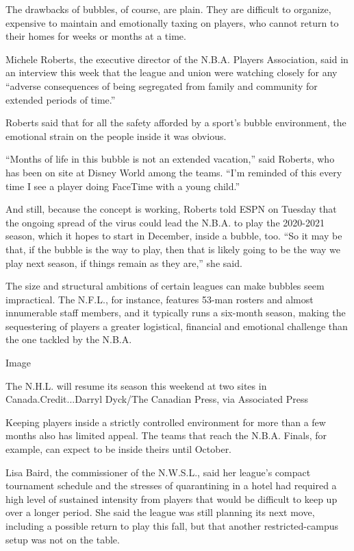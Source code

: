 The drawbacks of bubbles, of course, are plain. They are difficult to
organize, expensive to maintain and emotionally taxing on players, who
cannot return to their homes for weeks or months at a time.

Michele Roberts, the executive director of the N.B.A. Players
Association, said in an interview this week that the league and union
were watching closely for any ``adverse consequences of being segregated
from family and community for extended periods of time.''

Roberts said that for all the safety afforded by a sport's bubble
environment, the emotional strain on the people inside it was obvious.

``Months of life in this bubble is not an extended vacation,'' said
Roberts, who has been on site at Disney World among the teams. ``I'm
reminded of this every time I see a player doing FaceTime with a young
child.''

And still, because the concept is working, Roberts told ESPN on Tuesday
that the ongoing spread of the virus could lead the N.B.A. to play the
2020-2021 season, which it hopes to start in December, inside a bubble,
too. ``So it may be that, if the bubble is the way to play, then that is
likely going to be the way we play next season, if things remain as they
are,'' she said.

The size and structural ambitions of certain leagues can make bubbles
seem impractical. The N.F.L., for instance, features 53-man rosters and
almost innumerable staff members, and it typically runs a six-month
season, making the sequestering of players a greater logistical,
financial and emotional challenge than the one tackled by the N.B.A.

Image

The N.H.L. will resume its season this weekend at two sites in
Canada.Credit...Darryl Dyck/The Canadian Press, via Associated Press

Keeping players inside a strictly controlled environment for more than a
few months also has limited appeal. The teams that reach the N.B.A.
Finals, for example, can expect to be inside theirs until October.

Lisa Baird, the commissioner of the N.W.S.L., said her league's compact
tournament schedule and the stresses of quarantining in a hotel had
required a high level of sustained intensity from players that would be
difficult to keep up over a longer period. She said the league was still
planning its next move, including a possible return to play this fall,
but that another restricted-campus setup was not on the table.

